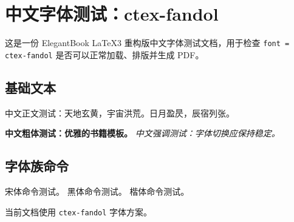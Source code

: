 \documentclass[lang = cn, font = ctex-fandol, mode = simple]{elegantbook-l3}
\begin{document}
\frontmatter
\tableofcontents

\mainmatter
\chapter{中文字体测试：ctex-fandol}

这是一份 ElegantBook LaTeX3 重构版中文字体测试文档，用于检查
\texttt{font = ctex-fandol} 是否可以正常加载、排版并生成 PDF。

\section{基础文本}

中文正文测试：天地玄黄，宇宙洪荒。日月盈昃，辰宿列张。

\textbf{中文粗体测试：优雅的书籍模板。}
\emph{中文强调测试：字体切换应保持稳定。}

\section{字体族命令}

{\songti 宋体命令测试。}
{\heiti 黑体命令测试。}
{\kaishu 楷体命令测试。}

\begin{theorem}[字体方案]
  当前文档使用 \texttt{ctex-fandol} 字体方案。
\end{theorem}
\end{document}
